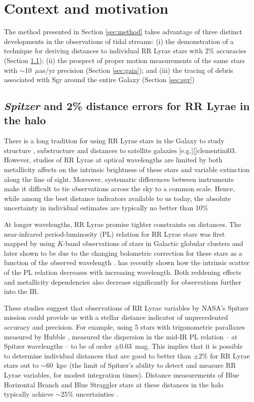 \documentclass[preprint]{aastex}
\begin{document}
\section{Context and motivation}
The method presented in Section \ref{sec:method} takes advantage of
three distinct developments in the observations of tidal streams: (i)
the demonstration of a technique for deriving distances to individual
RR Lyrae stars with 2\% accuracies (Section \ref{sec:spitzer}); (ii)
the prospect of proper motion measurements of the same stars with
$\sim$10~$\mu$as/yr precision (Section \ref{sec:gaia}); and (iii) the
tracing of debris associated with Sgr around the entire Galaxy
(Section \ref{sec:sgr})

\subsection{{\it Spitzer} and 2\% distance errors for RR Lyrae in the halo}
\label{sec:spitzer}

There is a long tradition for using RR Lyrae stars in the Galaxy to study structure
\citep[going back to first estimates of the distance to the Galactic center][]{shapley18},
substructure \citep[e.g.][]{sesar10} and distances to satellite galaxies [e.g.][]{clementini03}.
However, studies of RR Lyrae at optical wavelengths are limited by both metallicity affects on the intrinsic 
brightness of these stars and variable extinction along the line of sight.
Moreover, systematic differences between instruments make it difficult to tie observations across the sky
to a common scale. 
Hence, while among the best distance indicators available to us today, the absolute uncertainty in
individual estimates are typically no better than 10\%

At longer wavelengths, RR Lyrae promise tighter constraints on distances.
The near-infrared period-luminosity (PL) relation for RR
Lyrae stars was first mapped by \citet{longmore86} 
using $K$-band observations of stars in Galactic
globular clusters and later shown to be due to
the
changing bolometric correction for these stars as a function of the
observed wavelength \citep{catelan04}.
 \citet{madore12} has recently shown how the intrinsic scatter of the PL relation
 decreases  with increasing
wavelength. Both reddening effects and metallicity dependencies also
decrease significantly for observations further into the IR.

These studies suggest that observations of RR Lyrae variables by
NASA's Spitzer mission could provide us with a stellar distance
indicator of unprecedented accuracy and precision.
\citet{madore12}
For example, using 5 stars with trigonometric parallaxes
  measured by Hubble \citep{benedict11}, \citet{madore12} measured  
  the dispersion in the
mid-IR PL relation -- at Spitzer wavelengths --  to be of order
$\pm$0.03~mag. This implies that it is possible to determine
individual distances that are good to better than $\pm 2\%$ for RR
Lyrae stars out to $\sim$60~kpc (the limit of Spitzer's ability to
detect and measure RR Lyrae variables, for modest integration
times). Distance measurements of Blue Horizontal Branch and Blue Straggler stars at these distances in the halo typically achieve $\sim$25\% uncertainties \citep[e.g.,][]{deason12b}.
\end{document}
